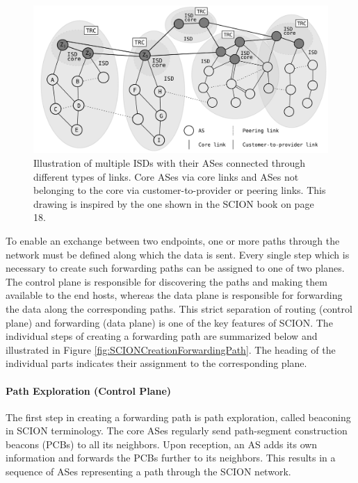 \begin{figure}
	\begin{center}
		\def\svgwidth{1\textwidth}
		\includegraphics[scale=0.24]{../illustrations/importantConcepts/SCIONISDsAndASes.pdf} 
		\caption[Caption for the list of figures.]{Illustration of multiple ISDs with their ASes connected through different types of links. Core ASes via core links and ASes not belonging to the core via customer-to-provider or peering links. This drawing is inspired by the one shown in the SCION book \cite{SCIONBook} on page 18.}
		\label{fig:SCIONArchitectureISDs}
	\end{center}
\end{figure}

To enable an exchange between two endpoints, one or more paths through the network must be defined along which the data is sent. Every single step which is necessary to create such forwarding paths can be assigned to one of two planes. The control plane is responsible for discovering the paths and making them available to the end hosts, whereas the data plane is responsible for forwarding the data along the corresponding paths. This strict separation of routing (control plane) and forwarding (data plane) is one of the key features of SCION. The individual steps of creating a forwarding path are summarized below and illustrated in Figure \ref{fig:SCIONCreationForwardingPath}. The heading of the individual parts indicates their assignment to the corresponding plane.

\paragraph{Path Exploration (Control Plane)}

The first step in creating a forwarding path is path exploration, called beaconing in SCION terminology. The core ASes regularly send path-segment construction beacons (PCBs) to all its neighbors. Upon reception, an AS adds its own information and forwards the PCBs further to its neighbors. This results in a sequence of ASes representing a path through the SCION network. 


